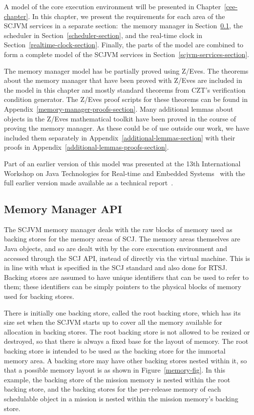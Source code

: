 \documentclass[a4paper,10pt]{report}
\begin{document}
A model of the core execution environment will be presented in
Chapter~\ref{cee-chapter}.
In this chapter, we present the requirements for each area of the
SCJVM services in a separate section:~the memory manager in
Section~\ref{memory-manager-section}, the scheduler in
Section~\ref{scheduler-section}, and the real-time clock in
Section~\ref{realtime-clock-section}.
Finally, the parts of the model are combined to form a complete model
of the SCJVM services in Section~\ref{scjvm-services-section}.

The memory manager model has be partially proved using Z/Eves.
The theorems about the memory manager that have been proved with
Z/Eves are included in the model in this chapter and mostly standard
theorems from CZT's verification condition generator.
The Z/Eves proof scripts for these theorems can be found in
Appendix~\ref{memory-manager-proofs-section}.
Many additional lemmas about objects in the Z/Eves mathematical
toolkit have been proved in the course of proving the memory manager.
As these could be of use outside our work, we have included them
separately in Appendix~\ref{additional-lemmas-section} with their
proofs in Appendix~\ref{additional-lemmas-proofs-section}.

Part of an earlier version of this model was presented at the 13th
International Workshop on Java Technologies for Real-time and Embedded
Systems~\cite{baxter2015a} with the full earlier version made available
as a technical report~\cite{baxter2015}.

\subsection{Memory Manager API}
\label{memory-manager-section}

The SCJVM memory manager deals with the raw blocks of memory used as
backing stores for the memory areas of SCJ.
The memory areas themselves are Java objects, and so are dealt with by
the core execution environment and accessed through the SCJ API,
instead of directly via the virtual machine.
This is in line with what is specified in the SCJ standard and also
done for RTSJ.
Backing stores are assumed to have unique identifiers that can be used
to refer to them; these identifiers can be simply pointers to the
physical blocks of memory used for backing stores.

There is initially one backing store, called the root backing store,
which has its size set when the SCJVM starts up to cover all the
memory available for allocation in backing stores.
The root backing store is not allowed to be resized or destroyed, so
that there is always a fixed base for the layout of memory.
The root backing store is intended to be used as the backing store for
the immortal memory area.
A backing store may have other backing stores nested within it, so
that a possible memory layout is as shown in Figure~\ref{memory-fig}.
In this example, the backing store of the mission memory is nested
within the root backing store, and the backing stores for the
per-release memory of each schedulable object in a mission is nested
within the mission memory's backing store.
\end{document}
